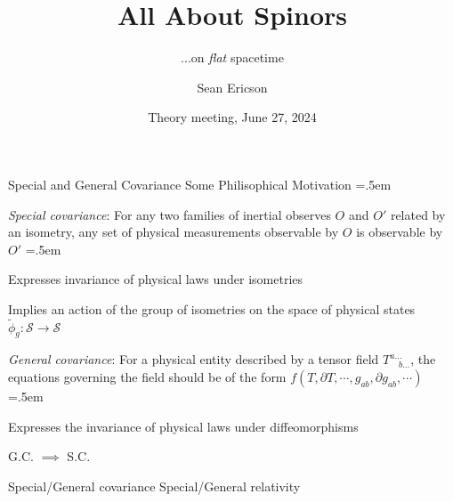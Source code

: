 \documentclass[xcolor={dvipsnames}]{beamer}
\title{All About Spinors}
\subtitle{...on \textit{flat} spacetime}
\author{Sean Ericson}
\institute{UO}
\date{Theory meeting, June 27, 2024}
\let\olditemize=\itemize
\let\endolditemize=\enditemize
\renewenvironment{itemize}{\olditemize \itemsep=.5em }{\endolditemize}
\begin{document}
\frame{\titlepage}

\begin{frame}{Special and General Covariance}
    \alert{Some Philisophical Motivation}
    \begin{itemize}
        \item<2-> \textit{Special covariance}: For any two families of inertial observes $O$ and $O'$ related by an isometry, any set of physical measurements observable by $O$ is observable by $O'$
        \begin{itemize}
            \item<3-> Expresses invariance of physical laws under isometries
            \item<4-> Implies an action of the group of isometries on the space of physical states $\tilde{\phi}_g:\mathcal{S}\rightarrow\mathcal{S}$
        \end{itemize} 
        \item<5-> \textit{General covariance}: For a physical entity described by a tensor field $T_{\quad b\dots}^{a\dots}$, the equations governing the field should be of the form $f(T, \partial T, \cdots, g_{ab}, \partial g_{ab}, \cdots)$
        \begin{itemize}
            \item<6-> Expresses the invariance of physical laws under diffeomorphisms
            \item<7-> G.C. $\implies$ S.C.
        \end{itemize}
        \item<8-> Special/General covariance \textrightarrow\; Special/General relativity
    \end{itemize}
\end{frame}
\end{document}
